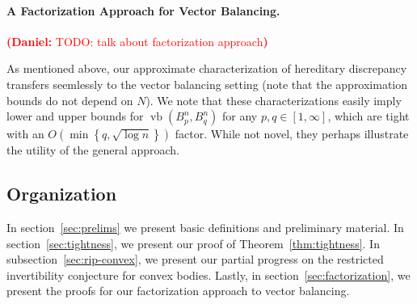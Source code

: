 \documentclass[11pt]{article}
\newcommand{\R}{{\mathbb{R}}}
\newcommand\eps{\varepsilon}
\newcommand{\eqdef}{\triangleq}
\newcommand{\set}[1]{\left\{ #1 \right\}}
\DeclareMathOperator{\disc}{disc}
\DeclareMathOperator{\hd}{hd}
\DeclareMathOperator{\vb}{vb}
\newcommand{\notename}[2]{{\textcolor{red}{{\bf (#1:} {#2}{\bf ) }}}}
\newcommand{\notename}[2]{{\textcolor{red}{\footnotesize{\bf (#1:} {#2}{\bf ) }}}}
\newcommand{\dnote}[1]{{\notename{Daniel}{#1}}}
\newcommand{\notename}[2]{{}}
\newcommand{\dnote}[1]{}
\begin{document}
\paragraph{\bf A Factorization Approach for Vector Balancing.}   
\dnote{TODO: talk about factorization approach}

As mentioned above, our approximate characterization of hereditary discrepancy
transfers seemlessly to the vector balancing setting (note that the
approximation bounds do not depend on $N$). We note that these characterizations
easily imply lower and upper bounds for $\vb(B_p^n,B_q^n)$ for any $p,q \in
[1,\infty]$, which are tight with an $O(\min \set{q,\sqrt{\log n}})$ factor.
While not novel, they perhaps illustrate the utility of the general approach.  

\subsection{Organization}

In section~\ref{sec:prelims} we present basic definitions and preliminary
material. In section~\ref{sec:tightness}, we present our proof of
Theorem~\ref{thm:tightness}. In subsection~\ref{sec:rip-convex}, we present our
partial progress on the restricted invertibility conjecture for convex bodies.
Lastly, in section~\ref{sec:factorization}, we present the proofs for our
factorization approach to vector balancing.

% 
\end{document}
